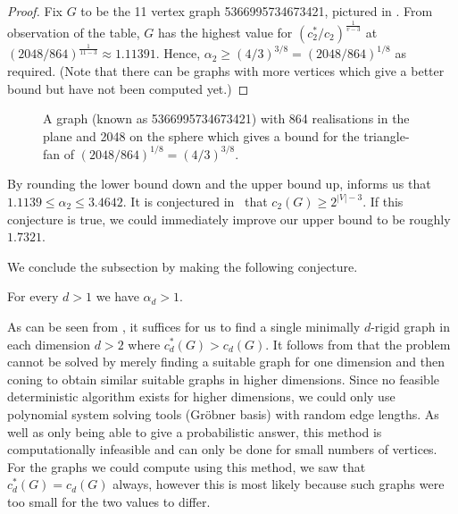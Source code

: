 \documentclass[ALCO]{cedram}
\begin{document}
\begin{proof}
	Fix $G$ to be the 11 vertex graph 5366995734673421, pictured in .
	From observation of the table, $G$ has the highest value for $\left( c^*_2/c_2\right)^{\frac{1}{v-3}} $ at $(2048/864)^{\frac{1}{11-3}} \approx 1.11391$.
	Hence, $\alpha_2 \geq (4/3)^{3/8} = (2048/864)^{1/8}$ as required.
	(Note that there can be graphs with more vertices which give a better bound but have not been computed yet.)
\end{proof}


\begin{figure}[ht]
  \centering
	\caption{A graph (known as 5366995734673421) with 864 realisations in the plane and 2048 on the sphere which gives a bound for the triangle-fan of $(2048/864)^{1/8} = (4/3)^{3/8}$.}
	\label{fig:bestforfan}
\end{figure}

By rounding the lower bound down and the upper bound up,  informs us that $1.1139 \leq \alpha_2 \leq 3.4642$.
It is conjectured in~\cite{LowerBounds} that $c_2(G) \geq 2^{|V|-3}$.
If this conjecture is true, we could immediately improve our upper bound to be roughly~$1.7321$.

We conclude the subsection by making the following conjecture.

\begin{conjecture}
	For every $d>1$ we have $\alpha_d >1$.
\end{conjecture}

As can be seen from , it suffices for us to find a single minimally $d$-rigid graph in each dimension $d>2$ where $c^*_d(G) >c_d(G)$.
It follows from  that the problem cannot be solved by merely finding a suitable graph for one dimension and then coning to obtain similar suitable graphs in higher dimensions.
Since no feasible deterministic algorithm exists for higher dimensions,
we could only use polynomial system solving tools (\eg Gr\"{o}bner basis) with random edge lengths.
As well as only being able to give a probabilistic answer,
this method is computationally infeasible and can only be done for small numbers of vertices.
For the graphs we could compute using this method, we saw that $c^*_d(G)=c_d(G)$ always, 
however this is most likely because such graphs were too small for the two values to differ.
\end{document}
